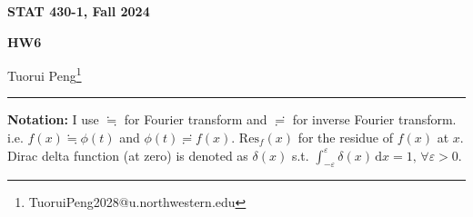 \documentclass[11pt,a4paper]{article}
\numberwithin{equation}{section}%
\begin{document}
\begin{center}\thispagestyle{plain}

{\LARGE\textbf{STAT 430-1, Fall 2024}}

{\Large\textbf{HW6}}

Tuorui Peng\footnote{TuoruiPeng2028@u.northwestern.edu}
\end{center}

\thispagestyle{myheadings}
\pagestyle{myheadings}

\setcounter{tocdepth}{1}
\tableofcontents

  





\vspace{12pt}


\hrule
\vspace{12pt}

\textbf{Notation:} I use $ \fallingdotseq $ for Fourier transform and $ \risingdotseq $ for inverse Fourier transform. i.e. $ f(x)\fallingdotseq \phi (t) $ and $ \phi (t)\risingdotseq f(x) $. $ \mathrm{ Res }_f(x)  $ for the residue of $ f(x) $ at $ x $. Dirac delta function (at zero) is denoted as $ \delta (x) $ s.t. $ \int_{-\varepsilon }^\varepsilon \delta (x) \,\mathrm{d}x=1 ,\,\forall \varepsilon >0 $.
\end{document}
